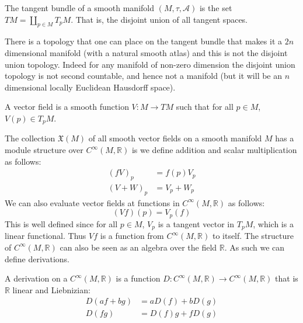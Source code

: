 \documentclass{article}                                                        %
\begin{document}
        \begin{definition}
            The tangent bundle of a smooth manifold $(M,\tau,\mathcal{A})$ is
            the set $TM=\coprod_{p\in{M}}T_{p}M$. That is, the disjoint union of
            all tangent spaces.
        \end{definition}
        There is a topology that one can place on the tangent bundle that makes
        it a $2n$ dimensional manifold (with a natural smooth atlas) and this is
        not the disjoint union topology. Indeed for any manifold of non-zero
        dimension the disjoint union topology is not second countable, and hence
        not a manifold (but it will be an $n$ dimensional locally Euclidean
        Hausdorff space).
        \begin{definition}
            A vector field is a smooth function $V:M\rightarrow{TM}$ such that
            for all $p\in{M}$, $V(p)\in{T}_{p}M$.
        \end{definition}
        The collection $\mathfrak{X}(M)$ of all smooth vector fields on a smooth
        manifold $M$ has a module structure over $C^{\infty}(M,\mathbb{R})$ is
        we define addition and scalar multiplication as follows:
        \begin{align}
            (fV)_{p}&=f(p)V_{p}\\
            (V+W)_{p}&=V_{p}+W_{p}
        \end{align}
        We can also evaluate vector fields at functions in
        $C^{\infty}(M,\mathbb{R})$ as follows:
        \begin{equation}
            (Vf)(p)=V_{p}(f)
        \end{equation}
        This is well defined since for all $p\in{M}$, $V_{p}$ is a tangent
        vector in $T_{p}M$, which is a linear functional. Thus $Vf$ is a
        function from $C^{\infty}(M,\mathbb{R})$ to itself. The structure of
        $C^{\infty}(M,\mathbb{R})$ can also be seen as an algebra over the field
        $\mathbb{R}$. As such we can define derivations.
        \begin{definition}
            A derivation on a $C^{\infty}(M,\mathbb{R})$ is a function
            $D:C^{\infty}(M,\mathbb{R})\rightarrow{C}^{\infty}(M,\mathbb{R})$
            that is $\mathbb{R}$ linear and Liebnizian:
            \begin{align}
                D(af+bg)&=aD(f)+bD(g)\\
                D(fg)&=D(f)g+fD(g)
            \end{align}
        \end{definition}
\end{document}
